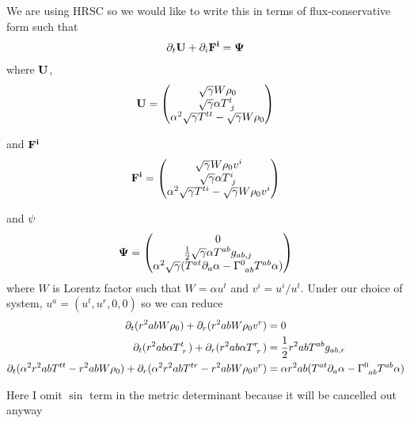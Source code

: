 \documentclass[prd]{revtex4}
\begin{document}
We are using HRSC so we would like to write this in terms of flux-conservative form such that
\begin{align}
\partial_t {\bf U} + \partial_i {\bf F^i} = {\bf \Psi}
\end{align}
where ${\bf U}$, 
\begin{align}
{\bf U} = 
\begin{pmatrix}
\sqrt{\gamma} W \rho_0 \\
\sqrt{\gamma} \alpha T\indices{^t_j} \\
\alpha^2 \sqrt{\gamma} T^{tt} - \sqrt{\gamma} W \rho_0
\end{pmatrix}
\end{align}

and ${\bf F^i}$
\begin{align}
{\bf F^i} = 
\begin{pmatrix}
\sqrt{\gamma} W \rho_0 v^i \\
\sqrt{\gamma} \alpha T\indices{^i_j} \\
\alpha^2 \sqrt{\gamma} T^{ti} - \sqrt{\gamma} W \rho_0 v^i
\end{pmatrix}
\end{align}

and ${\bf \psi}$
\begin{align}
{\bf \Psi} = 
\begin{pmatrix}
0\\
\frac{1}{2}\sqrt{\gamma} \alpha T\indices{^{ab}}g_{ab,j} \\
\alpha^2 \sqrt{\gamma} (T^{at} \partial_a \alpha - \Gamma\indices{^0_{ab}} T^{ab} \alpha )
\end{pmatrix}
\end{align}
where $W$ is Lorentz factor such that $W = \alpha u^t$ and $v^i = u^i/u^t$. Under our choice of system, $u^a = (u^t, u^r, 0, 0)$ so we can reduce
\begin{align}
\partial_t ( r^2 a b W \rho_0) + \partial_r (r^2 a b W \rho_0 v^r) &= 0 \\
\partial_t (r^2 a b \alpha T\indices{^t_r}) + \partial_r ( r^2 a b \alpha T\indices{^r_r}) &= \frac{1}{2} r^2 a b T^{ab} g_{ab,r} \\
\partial_t ( \alpha^2 r^2 a b T^{tt} - r^2 a b W \rho_0 ) + \partial_r(\alpha^2 r^2 a b T^{tr} - r^2 a b W \rho_0 v^r) &= \alpha r^2 ab (T^{at} \partial_a \alpha - \Gamma\indices{^0_{ab}} T^{ab} \alpha )
\end{align}


Here I omit $\sin$ term in the metric determinant because it will be cancelled out anyway
\end{document}
